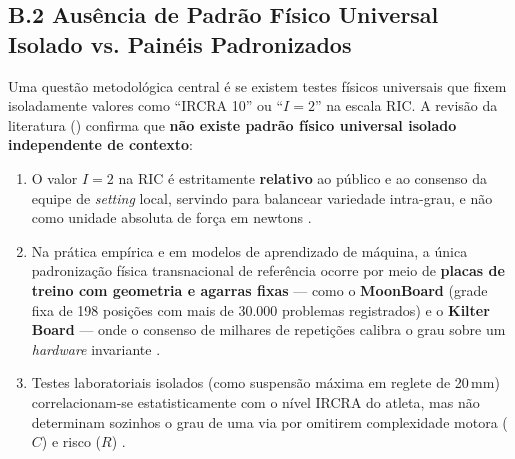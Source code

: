 \subsection*{B.2 Ausência de Padrão Físico Universal Isolado vs. Painéis Padronizados}
Uma questão metodológica central é se existem testes físicos universais que fixem isoladamente valores como ``IRCRA 10'' ou ``$I = 2$'' na escala RIC. A revisão da literatura (\cite{pmc_ric_study, rockrealms_setting}) confirma que \textbf{não existe padrão físico universal isolado independente de contexto}:
\begin{enumerate}
    \item O valor $I = 2$ na RIC é estritamente \textbf{relativo} ao público e ao consenso da equipe de \textit{setting} local, servindo para balancear variedade intra-grau, e não como unidade absoluta de força em newtons \cite{pmc_ric_study}.
    \item Na prática empírica e em modelos de aprendizado de máquina, a única padronização física transnacional de referência ocorre por meio de \textbf{placas de treino com geometria e agarras fixas} — como o \textbf{MoonBoard} (grade fixa de 198 posições com mais de 30.000 problemas registrados) e o \textbf{Kilter Board} — onde o consenso de milhares de repetições calibra o grau sobre um \textit{hardware} invariante \cite{pmc_ric_study, rockrealms_setting}.
    \item Testes laboratoriais isolados (como suspensão máxima em reglete de 20\,mm) correlacionam-se estatisticamente com o nível IRCRA do atleta, mas não determinam sozinhos o grau de uma via por omitirem complexidade motora ($C$) e risco ($R$) \cite{rpubs_finger, pmc_ric_study}.
\end{enumerate}
